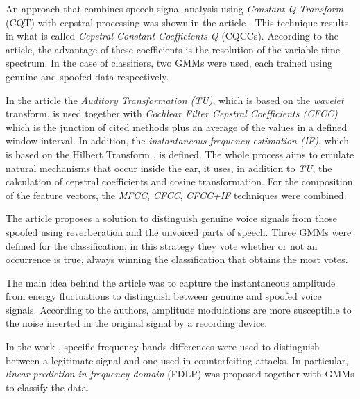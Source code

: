 	\par An approach that combines speech signal analysis using \textit{Constant Q Transform} (CQT) with cepstral processing was shown in the article \cite{TODISCO2017516}. This technique results in what is called \textit{Cepstral Constant Coefficients Q} (CQCCs). According to the article, the advantage of these coefficients is the resolution of the variable time spectrum. In the case of classifiers, two GMMs were used, each trained using genuine and spoofed data respectively.

	\par In the article \cite{Patel2015} the \textit{Auditory Transformation (TU)}, which is based on the \textit{wavelet} transform, is used together with \textit{Cochlear Filter Cepstral Coefficients (CFCC)} which is the junction of cited methods plus an average of the values in a defined window interval. In addition, the \textit{instantaneous frequency estimation (IF)}, which is based on the Hilbert Transform \cite{johansson1999hilbert} \cite{kschischang2006hilbert}, is defined. The whole process aims to emulate natural mechanisms that occur inside the ear,  it uses, in addition to \textit{TU}, the calculation of cepstral coefficients and cosine transformation. For the composition of the feature vectors, the \textit{MFCC}, \textit{CFCC}, \textit{CFCC+IF} techniques were combined.
	
	\par The article \cite{ISI:000490497200068} proposes a solution to distinguish genuine voice signals from those spoofed using reverberation and the unvoiced parts of speech. Three GMMs were defined for the classification, in this strategy they vote whether or not an occurrence is true, always winning the classification that obtains the most votes.	
		
	\par The main idea behind the article \cite{ISI:000465363900136} was to capture the instantaneous amplitude from energy fluctuations to distinguish between genuine and spoofed voice signals. According to the authors, amplitude modulations are more susceptible to the noise inserted in the original signal by a recording device.

	\par In the work \cite{ISI:000465363900139}, specific frequency bands differences were used to distinguish between a legitimate signal and one used in counterfeiting attacks. In particular, \textit{linear prediction in frequency domain} (FDLP) was proposed together with GMMs to classify the data.
	
